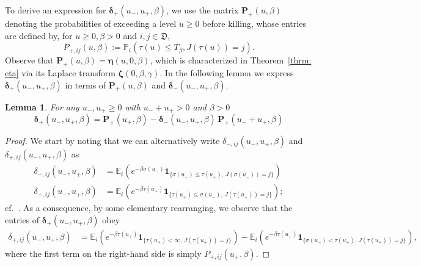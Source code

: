 \documentclass[reqno,12pt]{amsart}
\newcommand{\bs}{\boldsymbol}
\newcommand{\defD}{{\mathfrak D}}
\newtheorem{lemma}{Lemma}
\begin{document}
{To derive an expression for ${\bs \delta}_{+}(u_-, u_+, \beta)$, we use the matrix $\bs{P}_+(u,\beta)$ denoting the probabilities of exceeding a level $u\geqslant0$ before killing, whose entries are defined by, for $u\geqslant0, \beta>0$ and $i,j\in\defD $,
\begin{equation}
    P_{+,ij}(u,\beta) := \mathbb{P}_i\left(\tau(u) \leqslant T_{\beta}, J(\tau(u))=j\right).
\end{equation}
Observe that ${\bs P}_{+}(u,\beta)={\bs \eta}(u,0,\beta)$, which is characterized in Theorem~\ref{thrm: eta} via its Laplace transform ${\bs \zeta}(0,\beta,\gamma)$.
In the following lemma we express ${\bs \delta}_{+}(u_-, u_+, \beta)$ in terms of ${\bs P}_{+}(u,\beta)$ and ${\bs \delta}_{-}(u_-, u_+, \beta)$. 

\begin{lemma}\label{lemma: delta_+ in terms of delta_-}
    For any $u_-, u_{+} \geqslant 0$ with $u_-+u_+>0$ and $\beta>0$
    \begin{equation}\label{eq: delta_+ in terms of delta_-}
        {\bs \delta}_{+}(u_-, u_+, \beta) = {\bs P}_+(u_+, \beta) - {\bs \delta}_{-}(u_-,u_+,\beta)\,{\bs P}_{+}(u_-+u_+, \beta)
    \end{equation}
\end{lemma}
\begin{proof}
    We start by noting that we can alternatively write $ \delta_{-,ij}(u_-, u_+, \beta)$ and $ \delta_{+,ij}(u_-, u_+, \beta)$ as
\begin{align*}
    \delta_{-,ij}(u_-, u_+, \beta) &= \mathbb{E}_i\left(e^{-\beta \sigma(u_-)}\bs{1}_{\{\sigma(u_-) \leqslant \tau(u_+),\, J(\sigma(u_-))=j\}}\right) \\
    \delta_{+,ij}(u_-, u_+, \beta) &= \mathbb{E}_i\left(e^{-\beta \tau(u_+)}\bs{1}_{\{\tau(u_+) \leqslant \sigma(u_-),\, J(\tau(u_+))=j\}}\right);
\end{align*}
cf.\ \cite[Lemma 5.2]{MB}.
As a consequence, by some elementary rearranging, we observe that the entries of $\bs\delta_{+}(u_-, u_+, \beta)$ obey
\begin{align*}
    \delta_{+,ij}(u_-, u_+, \beta) &= \mathbb{E}_i\left(e^{-\beta \tau(u_+)}\bs{1}_{\{\tau(u_+) <\infty,\, J(\tau(u_+))=j\}}\right) - \mathbb{E}_i\left(e^{-\beta \tau(u_+)}\bs{1}_{\{\sigma(u_-)<\tau(u_+) ,\, J(\tau(u_+))=j\}}\right),
\end{align*}
where the first term on the right-hand side is simply $P_{+,ij}(u_+, \beta)$.

\end{proof}}
\end{document}
